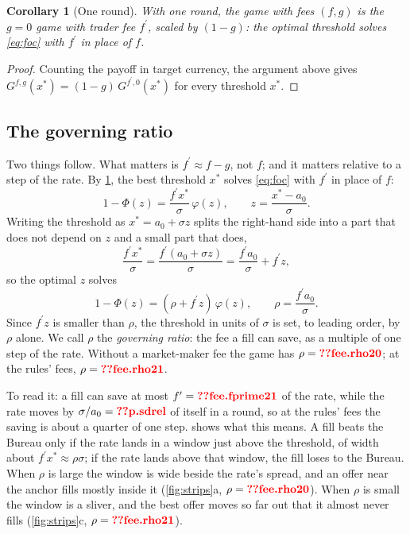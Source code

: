 \documentclass[11pt,a4paper]{article}
\makeatletter
\theoremstyle{plain}
\newtheorem{corollary}[proposition]{Corollary}
\theoremstyle{definition}
\newcommand{\val}[1]{\ifcsname val@#1\endcsname\csname val@#1\endcsname\else
  \textcolor{red}{\textbf{??\detokenize{#1}}}\PackageWarning{paper}{Missing value #1}\fi}
\newcommand{\1}{\mathbf{1}}
\newcommand{\fp}{f^{\prime}}
\makeatother
\begin{document}
\begin{corollary}[One round]\label{cor:oneround}
With one round, the game with fees $(f,g)$ is the $g=0$ game with trader fee $\fp$, scaled by $(1-g)$: the optimal threshold solves \eqref{eq:foc} with $\fp$ in place of $f$.
\end{corollary}

\begin{proof}
Counting the payoff in target currency, the argument above gives $G^{f,g}(x^*)=(1-g)\,G^{\fp,0}(x^*)$ for every threshold $x^*$.
\end{proof}

\subsection{The governing ratio}\label{sec:rho}
Two things follow. What matters is $\fp\approx f-g$, not $f$; and it matters relative to a step of the rate. By \cref{cor:oneround}, the best threshold $x^*$ solves \eqref{eq:foc} with $\fp$ in place of $f$:
\[
1-\Phi(z)=\frac{\fp x^*}{\sigma}\,\varphi(z),\qquad z=\frac{x^*-a_0}{\sigma}.
\]
Writing the threshold as $x^*=a_0+\sigma z$ splits the right-hand side into a part that does not depend on $z$ and a small part that does,
\[
\frac{\fp x^*}{\sigma}=\frac{\fp(a_0+\sigma z)}{\sigma}=\frac{\fp a_0}{\sigma}+\fp z,
\]
so the optimal $z$ solves
\begin{equation}\label{eq:rhofoc}
  1-\Phi(z) = (\rho+\fp z)\,\varphi(z),\qquad \rho = \frac{\fp a_0}{\sigma}.
\end{equation}
Since $\fp z$ is smaller than $\rho$, the threshold in units of $\sigma$ is set, to leading order, by $\rho$ alone. We call $\rho$ the \emph{governing ratio}: the fee a fill can save, as a multiple of one step of the rate. Without a market-maker fee the game has $\rho=\val{fee.rho20}$; at the rules' fees, $\rho=\val{fee.rho21}$.

To read it: a fill can save at most $\fp=\val{fee.fprime21}$ of the rate, while the rate moves by $\sigma/a_0=\val{p.sdrel}$ of itself in a round, so at the rules' fees the saving is about a quarter of one step.  shows what this means. A fill beats the Bureau only if the rate lands in a window just above the threshold, of width about $\fp x^*\approx\rho\sigma$; if the rate lands above that window, the fill loses to the Bureau. When $\rho$ is large the window is wide beside the rate's spread, and an offer near the anchor fills mostly inside it (\cref{fig:strips}a, $\rho=\val{fee.rho20}$). When $\rho$ is small the window is a sliver, and the best offer moves so far out that it almost never fills (\cref{fig:strips}c, $\rho=\val{fee.rho21}$).
\end{document}
